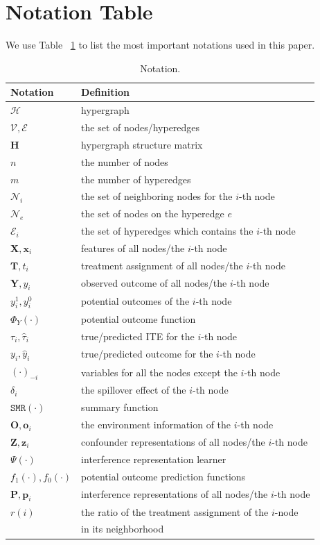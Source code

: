 \appendix
\section{Notation Table}
We use Table~ \ref{tab:notation} to list the most important notations used in this paper.
\begin{table}[H]
  \caption{Notation.}
  \label{tab:notation}
  \vspace{-4mm}
  \begin{tabular}{ll}
    \toprule
    Notation & Definition \\ 
    \midrule
    $\mathcal{H}$          & hypergraph\\
    $\mathcal{V},\mathcal{E}$          & the set of nodes/hyperedges \\
    $\mathbf{H}$          & hypergraph structure matrix\\
    $n$               & the number of nodes \\
    $m$               & the number of hyperedges\\
    $\mathcal{N}_i$ & the set of neighboring nodes for the $i$-th node \\
    $\mathcal{N}_e$ & the set of nodes on the hyperedge $e$ \\
    $\mathcal{E}_i$ & the set of hyperedges which contains the $i$-th node\\
    $\mathbf{X},\mathbf{x}_i$ & features of all nodes/the $i$-th node\\
    $\mathbf{T},{t}_i$ & treatment assignment of all nodes/the $i$-th node\\
    $\mathbf{Y},{y}_i$ & observed outcome of all nodes/the $i$-th node\\
    ${y}^1_i,y_i^0$ & potential outcomes of the $i$-th node\\
    $\Phi_Y(\cdot)$ & potential outcome function \\
    $\tau_i,\hat{\tau}_i$ & true/predicted ITE for the $i$-th node\\
    $y_i, \hat{y}_i$ & true/predicted outcome for the $i$-th node\\
    $(\cdot)_{-i}$ & variables for all the nodes except the $i$-th node\\
    $\delta_i$ & the spillover effect of the $i$-th node\\
    $\mathtt{SMR}(\cdot)$ & summary function\\
    $\mathbf{O}, \mathbf{o}_i$ & the environment information of the $i$-th node\\
    $\mathbf{Z},\mathbf{z}_i$ & confounder representations of all nodes/the $i$-th node\\
    $\Psi(\cdot)$ & interference representation learner\\
    $f_1(\cdot),f_0(\cdot)$ & potential outcome prediction functions\\
    $\mathbf{P},\mathbf{p}_i$ & interference representations of all nodes/the $i$-th node\\
    $r(i)$ & the ratio of the treatment assignment of the $i$-node \\&in its neighborhood\\
    \bottomrule
\end{tabular}
\end{table}


